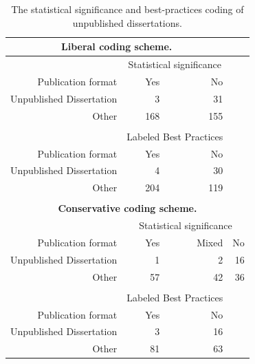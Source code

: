 \documentclass[man, mask]{apa6}
\begin{document}
\begin{table}[htbp]
	\centering
	\caption{The statistical significance and best-practices coding of unpublished dissertations.}
	\begin{tabular}{rrrr}
		\toprule
		\multicolumn{3}{c}{\textbf{Liberal coding scheme.}} &  \\
		\midrule
		& \multicolumn{2}{c}{Statistical significance} &  \\
		Publication format & Yes   & No    &  \\
		Unpublished Dissertation & 3     & 31    &  \\
		Other & 168   & 155   &  \\
		&       &       &  \\
		& \multicolumn{2}{c}{Labeled Best Practices} &  \\
		Publication format & Yes   & No    &  \\
		Unpublished Dissertation & 4     & 30    &  \\
		Other & 204   & 119   &  \\
		&       &       &  \\
		\multicolumn{4}{c}{\textbf{Conservative coding scheme.}} \\
		& \multicolumn{3}{c}{Statistical significance} \\
		Publication format & Yes   & Mixed & No \\
		Unpublished Dissertation & 1     & 2     & 16 \\
		Other & 57    & 42    & 36 \\
		&       &       &  \\
		& \multicolumn{2}{c}{Labeled Best Practices} &  \\
		Publication format & Yes   & No    &  \\
		Unpublished Dissertation & 3     & 16    &  \\
		Other & 81    & 63    &  \\
		\bottomrule
	\end{tabular}%
	\label{table:dissertations}%
\end{table}
\end{document}
